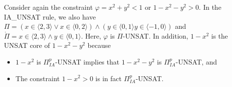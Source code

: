 \begin{example}
Consider again the constraint $\varphi = x^2 + y^2 < 1$ or $1 - x^2 - y^2 > 0$. In the \tiny IA\_UNSAT \normalsize rule, we also have $\Pi = (x \in \langle 2, 3 \rangle \vee x \in \langle 0, 2 \rangle) \wedge (y \in \langle 0, 1 \rangle y \in \langle -1, 0 \rangle)$ and $\mathring\Pi = x \in \langle 2, 3 \rangle \wedge y \in \langle 0, 1 \rangle$. Here, $\varphi$ is $\Pi$-UNSAT. In addition, $1 - x^2$ is the UNSAT core of $1 - x^2 - y^2$ because 
\begin{itemize}
\item $1 - x^2$ is $\Pi^p_{IA}$-UNSAT implies that $1 - x^2 - y^2$ is $\Pi^p_{IA}$-UNSAT, and 
\item The constraint $1 - x^2 > 0$ is in fact $\Pi^p_{IA}$-UNSAT.
\end{itemize} 
\end{example}

